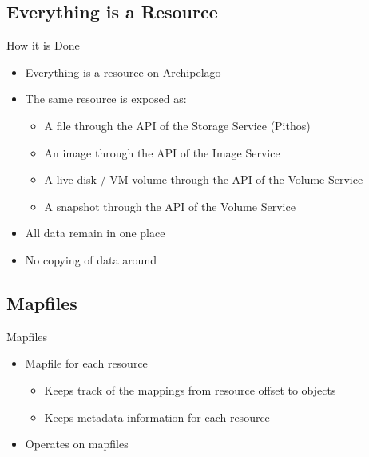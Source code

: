 \documentclass[utf8]{beamer}
\begin{document}
\subsection{Everything is a Resource}

\begin{frame}{How it is Done}

  \begin{itemize}
    \item Everything is a resource on Archipelago
    \item The \alert{same} resource is exposed as:
      \begin{itemize}
        \item A file through the API of the Storage Service (Pithos)
        \item An image through the API of the Image Service
        \item A live disk / VM volume through the API of the Volume Service
        \item A snapshot through the API of the Volume Service
      \end{itemize}
      \item All data remain in one place
      \item No copying of data around
    \end{itemize}
      
\end{frame}

\subsection{Mapfiles}

\begin{frame}{Mapfiles}

  \begin{itemize}
  \item Mapfile for each resource
    \begin{itemize}
      \item Keeps track of the mappings from resource offset to objects
      \item Keeps metadata information for each resource
    \end{itemize}
  \item Operates on mapfiles
  \end{itemize}
  
\end{frame}
\end{document}
